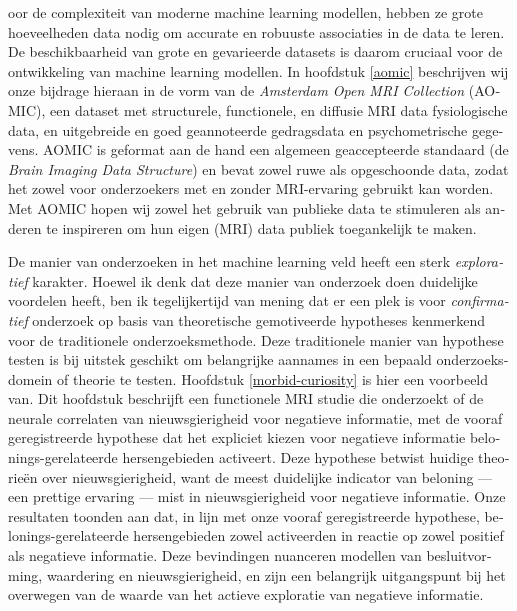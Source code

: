 \documentclass[12pt,american,a4paper,oneside,]{memoir} %
\newenvironment{dutch}[2][]{\begin{otherlanguage}{dutch}}{\end{otherlanguage}}
\begin{document}
\begin{dutch}
Door de complexiteit van moderne machine learning modellen, hebben ze grote hoeveelheden data nodig om accurate en robuuste associaties in de data te leren. De beschikbaarheid van grote en gevarieerde datasets is daarom cruciaal voor de ontwikkeling van machine learning modellen. In hoofdstuk \ref{aomic} beschrijven wij onze bijdrage hieraan in de vorm van de \emph{Amsterdam Open MRI Collection} (AOMIC), een dataset met structurele, functionele, en diffusie MRI data fysiologische data, en uitgebreide en goed geannoteerde gedragsdata en psychometrische gegevens. AOMIC is geformat aan de hand een algemeen geaccepteerde standaard (de \emph{Brain Imaging Data Structure}) en bevat zowel ruwe als opgeschoonde data, zodat het zowel voor onderzoekers met en zonder MRI-ervaring gebruikt kan worden. Met AOMIC hopen wij zowel het gebruik van publieke data te stimuleren als anderen te inspireren om hun eigen (MRI) data publiek toegankelijk te maken.

De manier van onderzoeken in het machine learning veld heeft een sterk \emph{exploratief} karakter. Hoewel ik denk dat deze manier van onderzoek doen duidelijke voordelen heeft, ben ik tegelijkertijd van mening dat er een plek is voor \emph{confirmatief} onderzoek op basis van theoretische gemotiveerde hypotheses kenmerkend voor de traditionele onderzoeksmethode. Deze traditionele manier van hypothese testen is bij uitstek geschikt om belangrijke aannames in een bepaald onderzoeksdomein of theorie te testen. Hoofdstuk \ref{morbid-curiosity} is hier een voorbeeld van. Dit hoofdstuk beschrijft een functionele MRI studie die onderzoekt of de neurale correlaten van nieuwsgierigheid voor negatieve informatie, met de vooraf geregistreerde hypothese dat het expliciet kiezen voor negatieve informatie belonings-gerelateerde hersengebieden activeert. Deze hypothese betwist huidige theorieën over nieuwsgierigheid, want de meest duidelijke indicator van beloning --- een prettige ervaring --- mist in nieuwsgierigheid voor negatieve informatie. Onze resultaten toonden aan dat, in lijn met onze vooraf geregistreerde hypothese, belonings-gerelateerde hersengebieden zowel activeerden in reactie op zowel positief als negatieve informatie. Deze bevindingen nuanceren modellen van besluitvorming, waardering en nieuwsgierigheid, en zijn een belangrijk uitgangspunt bij het overwegen van de waarde van het actieve exploratie van negatieve informatie.


\end{dutch}
\end{document}

